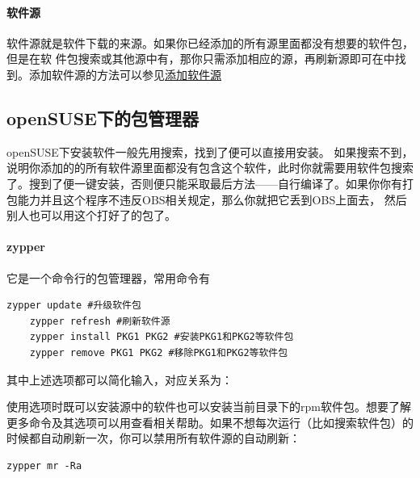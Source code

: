 \paragraph{软件源} 软件源就是软件下载的来源。如果你已经添加的所有源里面都没有想要的软件包，但是在软
件包搜索或其他源中有，那你只需添加相应的源，再刷新源即可在\zy 中找到。添加软件源的方法可以参见\href{https://zh.opensuse.org/SDB:%E6%B7%BB%E5%8A%A0%E8%BD%AF%E4%BB%B6%E6%BA%90}{添加软件源}
\subsection[包管理器]{openSUSE下的包管理器}
openSUSE下安装软件一般先用\zy 搜索，找到了便可以直接用\zy 安装。
如果搜索不到，说明你添加的的所有软件源里面都没有包含这个软件，此时你就需要用软件包搜索了。搜到了便一键安装，否则便只能采取最后方法——自行编译了。如果你你有打包能力并且这个程序不违反OBS相关规定，那么你就把它丢到OBS上面去，
然后别人也可以用这个打好了的包了。
\paragraph{zypper}\label{pre} 它是一个命令行的包管理器，常用命令有
\begin{Verbatim}[formatcom=\color{codec}]
    zypper update #升级软件包
    zypper refresh #刷新软件源
    zypper install PKG1 PKG2 #安装PKG1和PKG2等软件包
    zypper remove PKG1 PKG2 #移除PKG1和PKG2等软件包
\end{Verbatim}
其中上述选项都可以简化输入，对应关系为：
\begin{compactitem}
 \item {}
 \item {}
 \item {}
 \item {}
\end{compactitem}

使用选项时既可以安装源中的软件也可以安装当前目录下的rpm软件包。想要了解更多命令及其选项可以用查看相关帮助。如果不想每次运行\zy （比如搜索软件包）的时候都自动刷新一次，你可以禁用所有软件源的自动刷新：
\begin{Verbatim}[formatcom=\color{codec}]
    zypper mr -Ra
\end{Verbatim}

